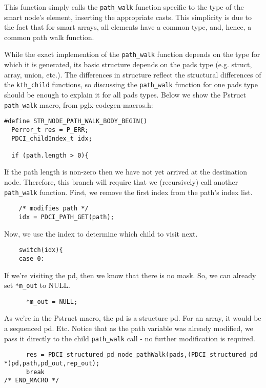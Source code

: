 \documentclass{article}
\begin{document}
This function simply calls the \verb+path_walk+ function specific to the type 
of the smart node's element, inserting the appropriate casts. This 
simplicity is due to the fact that for smart arrays, all elements have a 
common type, and, hence, a common path walk function.

  While the exact implemention of the \verb+path_walk+ function depends on the 
type for which it is generated, its basic structure depends on the pads 
type (e.g. struct, array, union, etc.). The differences in structure 
reflect the structural differences of the \verb+kth_child+ functions, so 
discussing the \verb+path_walk+ function for one pads type should be enough to 
explain it for all pads types. Below we show the Pstruct \verb+path_walk+ 
macro, from pglx-codegen-macros.h:

\begin{verbatim}
#define STR_NODE_PATH_WALK_BODY_BEGIN()
  Perror_t res = P_ERR;
  PDCI_childIndex_t idx;
 
  if (path.length > 0){
\end{verbatim}

If the path length is non-zero then we have not yet arrived at the 
destination node.  Therefore, this branch will require that we 
(recursively) call another \verb+path_walk+ function.
First, we remove the first index from the path's index list.

\begin{verbatim}
    /* modifies path */
    idx = PDCI_PATH_GET(path);
\end{verbatim}

Now, we use the index to determine which child to visit next.

\begin{verbatim}
    switch(idx){
    case 0:
\end{verbatim}

If we're visiting the pd, then we know that there is no mask. So, we can 
already set \verb+*m_out+ to NULL.

\begin{verbatim}
      *m_out = NULL;
\end{verbatim}

As we're in the Pstruct macro, the pd is a structure pd. For an array, 
it would be a sequenced pd. Etc. Notice that as the path variable was 
already modified, we pass it directly to the child \verb+path_walk+ call - no 
further modification is required.

\begin{verbatim}
      res = PDCI_structured_pd_node_pathWalk(pads,(PDCI_structured_pd 
*)pd,path,pd_out,rep_out);
      break
/* END_MACRO */
\end{verbatim}
\end{document}
